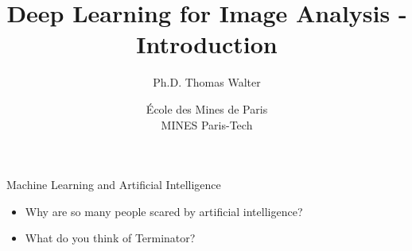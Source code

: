 \documentclass[xcolor=pdftex,dvipsnames,table]{beamer}
\title{Deep Learning for Image Analysis - Introduction}
\author{Ph.D. Thomas Walter}
\date{ \'Ecole des Mines de Paris \\ MINES Paris-Tech}
\begin{document}
\begin{frame}
\titlepage
\end{frame}


\begin{frame}{Machine Learning and Artificial Intelligence}
\begin{itemize}
\item Why are so many people scared by artificial intelligence?
\item What do you think of Terminator? 
\end{itemize}
\end{frame}
\end{document}
